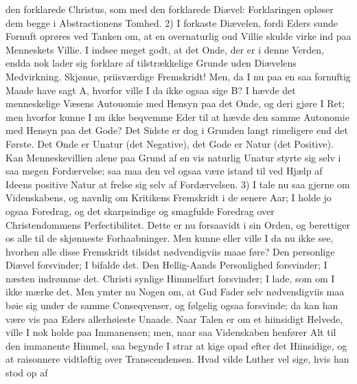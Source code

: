 \documentclass[12pt,a4paper]{book}
\begin{document}
den forklarede Christus, som med den forklarede Diævel: Forklaringen opløser dem begge i
Abstractionens Tomhed. 2) I forkaste Diævelen, fordi Eders sunde Fornuft oprøres ved
Tanken om, at en overnaturlig oud Villie skulde virke ind paa Menneskets Villie. I indsee
meget godt, at det Onde, der er i denne Verden, endda nok lader sig forklare af
tilstrækkelige Grunde uden Diævelens Medvirkning. Skjønue, priisværdige Fremskridt! Men,
da I nu paa en saa fornuftig Maade have sagt A, hvorfor ville I da ikke ogsaa sige B? I
hævde det menneskelige Væsens Autouomie med Hensyn paa det Onde, og deri gjøre I Ret; men
hvorfor kunne I nu ikke beqvemme Eder til at hævde den samme Autonomie med Hensyn paa det
Gode? Det Sidste er dog i Grunden langt rimeligere end det Første. Det Onde er Unatur (det
Negative), det Gode er Natur (det Positive). Kan Menneskevillien alene paa Grund af en vis
naturlig Unatur styrte sig selv i saa megen Fordærvelse; saa maa den vel ogsaa være
istand til ved Hjælp af Ideens positive Natur at frelse sig selv af Fordærvelsen. 3) I
tale nu saa gjerne om Videnskabens, og navnlig om Kritikens Fremskridt i de senere Aar; I
holde jo ogsaa Foredrag, og det skarpsindige og smagfulde Foredrag over Christendommens
Perfectibilitet. Dette er nu forsaavidt i sin Orden, og berettiger os alle til de
skjønneste Forhaabninger. Men kunne eller ville I da nu ikke see, hvorhen alle disse
Fremskridt tilsidst nødvendigviis maae føre? Den personlige Diævel forsvinder; I bifalde
det. Den Hellig-Aands Personlighed forsvinder; I næsten indrømme det. Christi synlige
Himmelfart forsvinder; I lade, som om I ikke mærke det. Men ymter nu Nogen om, at Gud
Fader selv nødvendigviis maa bøie sig under de samme Conseqvenser, og følgelig ogsaa
forsvinde; da kan han være vis paa Eders allerhøieste Unaade. Naar Talen er om et
hiinsidigt Helvede, ville I nok holde paa Immanensen; men, naar saa Videnskaben henfører
Alt til den immanente Himmel, saa begynde I strar at kige opad efter det Hiinsidige, og at
raisonnere vidtløftig over Transcendensen. Hvad vilde Luther vel sige, hvis han stod op af
\end{document}
